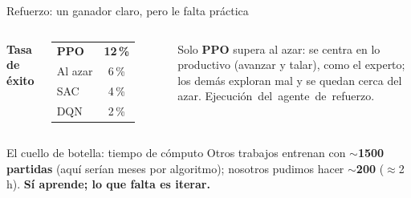 \documentclass[aspectratio=169,10pt]{beamer}
\newcommand{\hl}[1]{\textcolor{UDCmag}{\textbf{#1}}}
\begin{document}
\begin{frame}{Refuerzo: un ganador claro, pero le falta práctica}
  \begin{columns}[T]
      \textbf{Tasa de éxito}
      \begin{table}\centering\small
        \begin{tabular}{@{}lc@{}}
          \toprule
          \hl{PPO} & \hl{12\,\%}\\
          Al azar & 6\,\%\\
          SAC & 4\,\%\\
          DQN & 2\,\%\\
          \bottomrule
        \end{tabular}
      \end{table}
      \footnotesize Solo \hl{PPO} supera al azar: se centra en lo productivo (avanzar y
      talar), como el experto; los demás exploran mal y se quedan cerca del azar.
      \centering
      \vspace{0.2em}
      \mbox{\scriptsize Ejecución del agente de refuerzo.}
  \end{columns}

  \vspace{0.1em}
  \begin{alertblock}{El cuello de botella: tiempo de cómputo}
    \footnotesize Otros trabajos entrenan con \hl{$\sim$1500 partidas} (aquí serían meses por
    algoritmo); nosotros pudimos hacer \hl{$\sim$200} ($\approx$2 h).
    \hl{Sí aprende; lo que falta es iterar.}
  \end{alertblock}
\end{frame}

\end{document}
